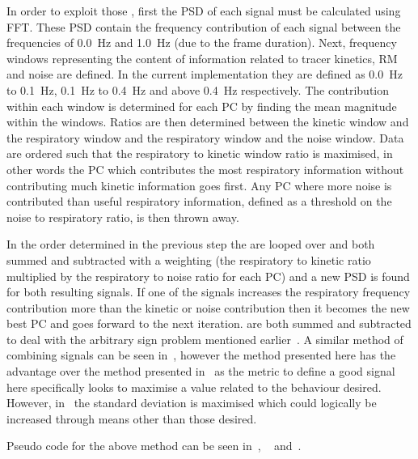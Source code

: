                     In order to exploit those , first the \gls{PSD} of each signal must be calculated using \gls{FFT}. These \gls{PSD} contain the frequency contribution of each signal between the frequencies of \SI{0.0}{\hertz} and \SI{1.0}{\hertz} (due to the frame duration). Next, frequency windows representing the content of information related to tracer kinetics, \gls{RM} and noise are defined. In the current implementation they are defined as \SI{0.0}{\hertz} to \SI{0.1}{\hertz}, \SI{0.1}{\hertz} to \SI{0.4}{\hertz} and above \SI{0.4}{\hertz} respectively. The contribution within each window is determined for each \gls{PC} by finding the mean magnitude within the windows. Ratios are then determined between the kinetic window and the respiratory window and the respiratory window and the noise window. Data are ordered such that the respiratory to kinetic window ratio is maximised, in other words the \gls{PC} which contributes the most respiratory information without contributing much kinetic information goes first. Any \gls{PC} where more noise is contributed than useful respiratory information, defined as a threshold on the noise to respiratory ratio, is then thrown away.
                    
                    In the order determined in the previous step the  are looped over and both summed and subtracted with a weighting (the respiratory to kinetic ratio multiplied by the respiratory to noise ratio for each \gls{PC}) and a new \gls{PSD} is found for both resulting signals. If one of the signals increases the respiratory frequency contribution more than the kinetic or noise contribution then it becomes the new best \gls{PC} and goes forward to the next iteration.  are both summed and subtracted to deal with the arbitrary sign problem mentioned earlier~. A similar method of combining signals can be seen in~, however the method presented here has the advantage over the method presented in~ as the metric to define a good signal here specifically looks to maximise a value related to the behaviour desired. However, in~ the standard deviation is maximised which could logically be increased through means other than those desired.
                    
                    Pseudo code for the above method can be seen in~, ~ and~.
                    
